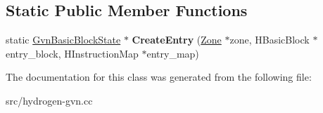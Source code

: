 \subsection*{Static Public Member Functions}
\begin{DoxyCompactItemize}
\item 
\hypertarget{classv8_1_1internal_1_1_gvn_basic_block_state_a1d9de2e87efd8ad965f528ee52d91af1}{}static \hyperlink{classv8_1_1internal_1_1_gvn_basic_block_state}{Gvn\+Basic\+Block\+State} $\ast$ {\bfseries Create\+Entry} (\hyperlink{classv8_1_1internal_1_1_zone}{Zone} $\ast$zone, H\+Basic\+Block $\ast$entry\+\_\+block, H\+Instruction\+Map $\ast$entry\+\_\+map)\label{classv8_1_1internal_1_1_gvn_basic_block_state_a1d9de2e87efd8ad965f528ee52d91af1}

\end{DoxyCompactItemize}


The documentation for this class was generated from the following file\+:\begin{DoxyCompactItemize}
\item 
src/hydrogen-\/gvn.\+cc\end{DoxyCompactItemize}

